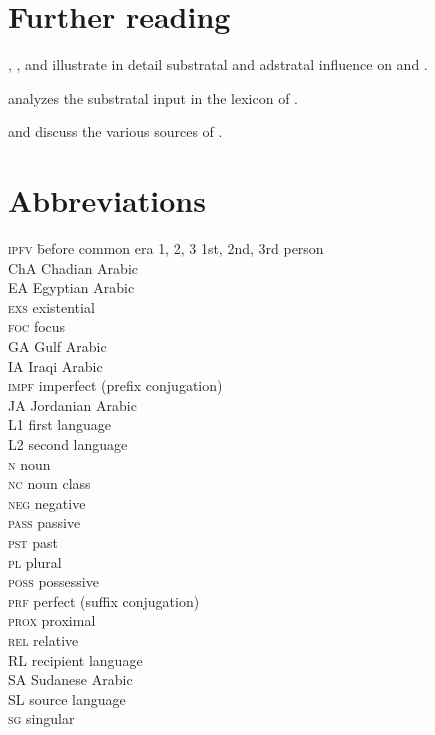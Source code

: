 \documentclass[output=paper]{langsci/langscibook}
\begin{document}
\section*{Further reading}
\begin{furtherreading}
\item \citet{Miller1993}, \citet{Nakao2012}, and \citet{Luffin2014} illustrate in detail substratal and adstratal influence on   and .
\item \citet{Avram2019} analyzes the substratal input in the lexicon of .
\item \citet{Avram2017article} and \citet{Bakir2017} discuss the various sources of .
\end{furtherreading}

\section*{Abbreviations}
\setlength{\columnsep}{30pt}
\begin{multicols}{2}
\begin{tabbing}
\textsc{ipfv} \hspace{1em} \= before common era\kill
\textsc{1, 2, 3} \> 1st, 2nd, 3rd person \\
{ChA} \> {Chadian} {Arabic} \\
{EA} \> {Egyptian Arabic} \\
\textsc{exs} \> {existential} \\
\textsc{foc} \> focus \\
{GA} \> Gulf Arabic \\
{IA} \> {Iraqi} {Arabic} \\
\textsc{impf} \> imperfect (prefix conjugation) \\
{JA} \> {Jordanian} {Arabic} \\
L1 \> first language\\
L2 \> second language\\
\textsc{n} \> noun \\
\textsc{nc} \> noun class \\
\textsc{neg} \> negative \\
\textsc{pass} \> {passive} \\
\textsc{pst} \> past \\
\textsc{pl} \> plural \\
\textsc{poss} \> possessive \\
\textsc{prf} \> perfect (suffix conjugation) \\
\textsc{prox} \> proximal \\
\textsc{rel} \> {relative} \\
{RL} \> {recipient language} \\
SA \> {Sudanese} {Arabic} \\
{SL} \> {source language} \\
\textsc{sg} \> singular
\end{tabbing}
\end{multicols}


\sloppy\printbibliography[heading=subbibliography,notkeyword=this]
\end{document}
